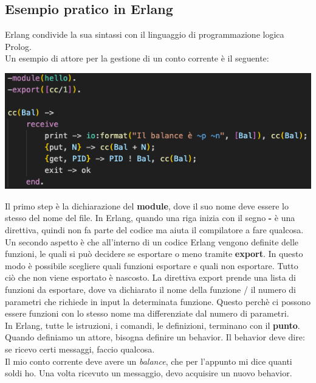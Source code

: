 \documentclass{article}
\begin{document}
\subsection*{Esempio pratico in Erlang}
Erlang condivide la sua sintassi con il linguaggio di programmazione logica Prolog.\\
Un esempio di attore per la gestione di un conto corrente è il seguente:
\begin{center}
    \includegraphics[width=1\textwidth]{img/hello_code.png}
\end{center}
Il primo step è la dichiarazione del \textbf{module}, dove il suo nome deve essere lo stesso del nome del file. In Erlang, quando una riga inizia con il segno \textbf{-} è una direttiva, quindi non fa parte del codice ma aiuta il compilatore a fare qualcosa.\vspace{14pt}\\
Un secondo aspetto è che all'interno di un codice Erlang vengono definite delle funzioni, le quali si può decidere se esportare o meno tramite \textbf{export}. In questo modo è possibile scegliere quali funzioni esportare e quali non esportare. Tutto ciò che non viene esportato è nascosto. La direttiva export prende una lista di funzioni da esportare, dove va dichiarato il nome della funzione / il numero di parametri che richiede in input la determinata funzione. Questo perchè ci possono essere funzioni con lo stesso nome ma differenziate dal numero di parametri.\vspace{14pt}\\
In Erlang, tutte le istruzioni, i comandi, le definizioni, terminano con il \textbf{punto}.\vspace{14pt}\\
Quando definiamo un attore, bisogna definire un behavior. Il behavior deve dire: se ricevo certi messaggi, faccio qualcosa.\\
Il mio conto corrente deve avere un \textit{balance}, che per l'appunto mi dice quanti soldi ho. Una volta ricevuto un messaggio, devo acquisire un nuovo behavior.\\
\end{document}
